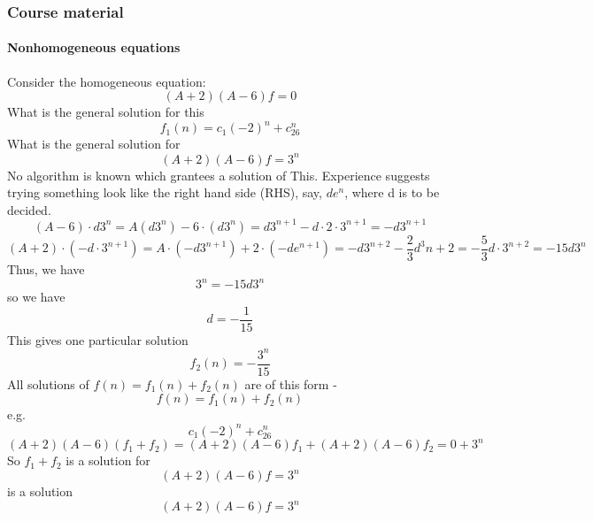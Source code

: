 \documentclass{article}
\begin{document}
\subsubsection{Course material}
\paragraph{Nonhomogeneous equations}
Consider the homogeneous equation:$$(A+2)(A-6)f=0$$
What is the general solution for this $$f_1(n)=c_1(-2)^n+c_26^n$$
What is the general solution for $$(A+2)(A-6)f=3^n$$
No algorithm is known which grantees a solution of This.\newline
Experience suggests trying something look like the right
hand side (RHS), say, $de^n$, where d is to be decided.
$$(A-6)\cdot d3^n=A(d3^n)-6\cdot (d3^n)=d3^{n+1}-d\cdot 2\cdot 3^{n+1}=-d3^{n+1}$$
$$(A+2)\cdot (-d\cdot 3^{n+1})=A\cdot (-d3^{n+1})+2\cdot (-de^{n+1})=-d3^{n+2}-\frac{2}{3}d^3{n+2}=-\frac{5}{3}d\cdot 3^{n+2}=-15d3^n$$
Thus, we have$$3^n=-15d3^n$$
so we have 
$$d=-\frac{1}{15}$$
This gives one particular solution
$$f_2(n)=-\frac{3^n}{15}$$
All solutions of $f(n)=f_1(n)+f_2(n)$ are of this form - $$f(n)=f_1(n)+f_2(n)$$
e.g. $$c_1(-2)^n+c_26^n$$
$$(A+2)(A-6)(f_1+f_2)=(A+2)(A-6)f_1+(A+2)(A-6)f_2=0+3^n$$
So $f_1+f_2$ is a solution for $$(A+2)(A-6)f=3^n$$ is a solution $$(A+2)(A-6)f=3^n$$
\end{document}
